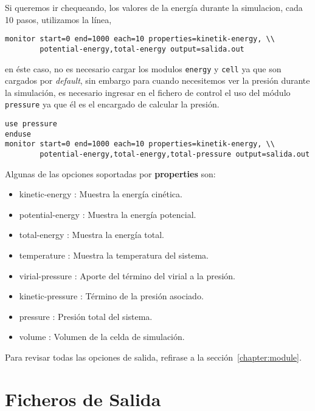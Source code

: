 \documentclass[a4paper,10pt]{scrbook}
\begin{document}
Si queremos ir chequeando, los valores de la energ\'ia durante la simulacion, cada 10 pasos, utilizamos la l\'inea,

\begin{verbatim}
monitor start=0 end=1000 each=10 properties=kinetik-energy, \\
        potential-energy,total-energy output=salida.out
\end{verbatim}

en \'este caso, no es necesario cargar los modulos \verb|energy| y \verb|cell| ya que son cargados por \textit{default}, sin embargo para cuando necesitemos ver la presi\'on durante la simulaci\'on, es necesario ingresar en el fichero de control el uso del m\'odulo \verb|pressure| ya que \'el es el encargado de calcular la presi\'on.

\begin{verbatim}
use pressure
enduse
monitor start=0 end=1000 each=10 properties=kinetik-energy, \\
        potential-energy,total-energy,total-pressure output=salida.out
\end{verbatim}

Algunas de las opciones soportadas por \textbf{properties} son:

\begin{itemize}
 \item kinetic-energy : Muestra la energ\'ia cin\'etica.
 \item potential-energy : Muestra la energ\'ia potencial.
 \item total-energy : Muestra la energ\'ia total.
 \item temperature : Muestra la temperatura del sistema.
 \item virial-pressure : Aporte del t\'ermino del virial a la presi\'on.
 \item kinetic-pressure : T\'ermino de la presi\'on asociado.
 \item pressure : Presi\'on total del sistema.
 \item volume : Volumen de la celda de simulaci\'on.
\end{itemize}

Para revisar todas las opciones de salida, refirase a la secci\'on~\ref{chapter:module}.

\section{Ficheros de Salida}

\end{document}
